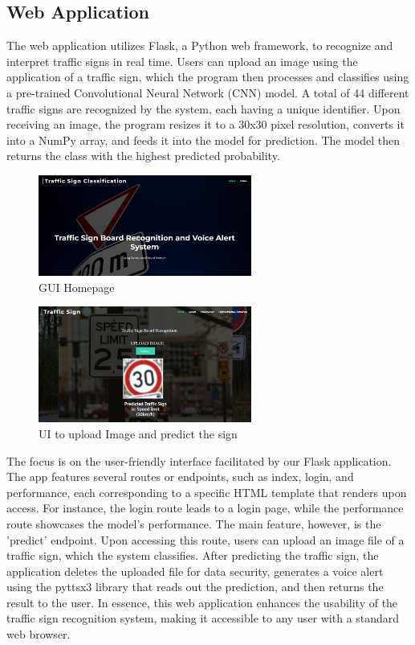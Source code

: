\documentclass[conference]{IEEEtran}
\begin{document}
\subsection{Web Application}
The web application utilizes Flask, a Python web framework, to recognize and interpret traffic signs in real time. Users can upload an image using the application of a traffic sign, which the program then processes and classifies using a pre-trained Convolutional Neural Network (CNN) model. A total of 44 different traffic signs are recognized by the system, each having a unique identifier. Upon receiving an image, the program resizes it to a 30x30 pixel resolution, converts it into a NumPy array, and feeds it into the model for prediction. The model then returns the class with the highest predicted probability.
    \begin{figure}[htp]
    \centering
    \includegraphics[width=7cm]{images/predict.jpeg}
    \centering
    \caption{GUI Homepage}
    \end{figure}
  \begin{figure}[htp]
    \centering
    \includegraphics[width=7cm]{images/GUI.jpeg}
    \centering
    \caption{UI to upload Image and predict the sign}
    \end{figure}
The focus is on the user-friendly interface facilitated by our Flask application. The app features several routes or endpoints, such as index, login, and performance, each corresponding to a specific HTML template that renders upon access. For instance, the login route leads to a login page, while the performance route showcases the model's performance. The main feature, however, is the 'predict' endpoint. Upon accessing this route, users can upload an image file of a traffic sign, which the system classifies. After predicting the traffic sign, the application deletes the uploaded file for data security, generates a voice alert using the pyttsx3 library that reads out the prediction, and then returns the result to the user. In essence, this web application enhances the usability of the traffic sign recognition system, making it accessible to any user with a standard web browser.
    
\end{document}
